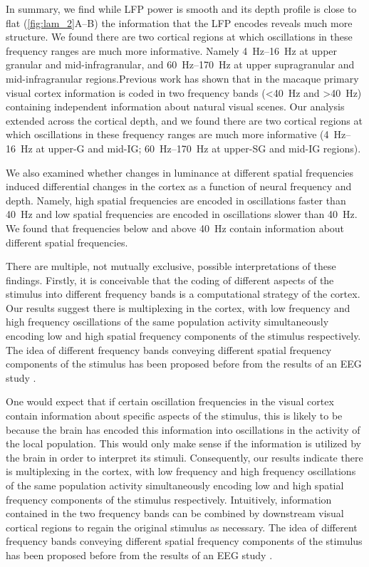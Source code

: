 In summary, we find while \ac{LFP} power is smooth and its depth profile is close to flat (\autoref{fig:lam_2}A--B) the information that the \ac{LFP} encodes reveals much more structure.
We found there are two cortical regions at which oscillations in these frequency ranges are much more informative.
Namely \SIrange{4}{16}{Hz} at upper granular and mid-infragranular, and \SIrange{60}{170}{Hz} at upper supragranular and mid{}-infragranular regions.Previous work \citep{Belitski2008} has shown that in the macaque primary visual cortex information is coded in two frequency bands (\SI{<40}{Hz} and \SI{>40}{Hz}) containing independent information about natural visual scenes.
Our analysis extended across the cortical depth, and we found there are two cortical regions at which oscillations in these frequency ranges are much more informative (\SIrange{4}{16}{Hz} at upper-\ac{G} and mid-\ac{IG}; \SIrange{60}{170}{Hz} at upper-\ac{SG} and mid-\ac{IG} regions).

We also examined whether changes in luminance at different spatial frequencies induced differential changes in the cortex as a function of neural frequency and depth.
Namely, high spatial frequencies are encoded in oscillations faster than \SI{40}{Hz} and low spatial frequencies are encoded in oscillations slower than \SI{40}{Hz}.
We found that frequencies below and above \SI{40}{Hz} contain information about different spatial frequencies.

There are multiple, not mutually exclusive, possible interpretations of these findings.
Firstly, it is conceivable that the coding of different aspects of the stimulus into different frequency bands is a computational strategy of the cortex.
Our results suggest there is multiplexing in the cortex, with low frequency and high frequency oscillations of the same population activity simultaneously encoding low and high spatial frequency components of the stimulus respectively.
The idea of different frequency bands conveying different spatial frequency components of the stimulus has been proposed before from the results of an \ac{EEG} study \citep{Smith2006}.

One would expect that if certain oscillation frequencies in the visual cortex contain information about specific aspects of the stimulus, this is likely to be because the brain has encoded this information into oscillations in the activity of the local population.
This would only make sense if the information is utilized by the brain in order to interpret its stimuli.
Consequently, our results indicate there is multiplexing in the cortex, with low frequency and high frequency oscillations of the same population activity simultaneously encoding low and high spatial frequency components of the stimulus respectively.
Intuitively, information contained in the two frequency bands can be combined by downstream visual cortical regions to regain the original stimulus as necessary.
The idea of different frequency bands conveying different spatial frequency components of the stimulus has been proposed before from the results of an \ac{EEG} study \citep{Smith2006}.

